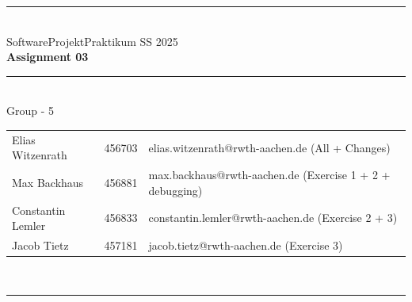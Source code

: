 \documentclass[a4paper,12pt]{article}
\begin{document}
\begin{center}
	\rule{\textwidth}{0.1pt}\\[1cm]
	
	\Large SoftwareProjektPraktikum SS 2025\\\bf Assignment 03
\end{center}


\begin{center}

	\rule{\textwidth}{0.1pt}\\[0.5cm]

	{\Large Group - 5\\[5mm]} %

	\begin{tabular}{lll}
		Elias Witzenrath & 456703 & elias.witzenrath@rwth-aachen.de (All + Changes) \\

		Max Backhaus & 456881 & max.backhaus@rwth-aachen.de (Exercise 1 + 2 + debugging)\\

		Constantin Lemler & 456833 & constantin.lemler@rwth-aachen.de (Exercise 2 + 3)\\

        Jacob Tietz & 457181 & jacob.tietz@rwth-aachen.de (Exercise 3) \\

	\end{tabular}\\[0.5cm]

	\rule{\textwidth}{0.1pt}\\[1cm]

\end{center}






\end{document}
